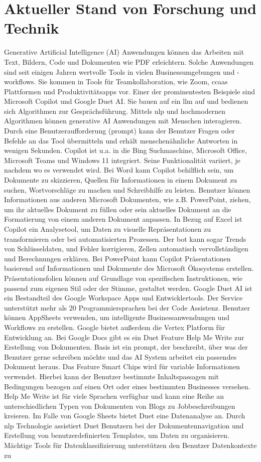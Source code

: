 \section{Aktueller Stand von Forschung und Technik}
Generative Artificial Intelligence (AI) Anwendungen können das Arbeiten mit Text, Bildern, Code und Dokumenten wie PDF erleichtern. Solche Anwendungen sind seit einigen Jahren wertvolle Tools in vielen Businessumgebungen und -workflows. Sie kommen in Tools für Teamkollaboration, wie Zoom, \gls{ccaas} Plattformen und Produktivitätsapps vor. Einer der prominentesten Beispiele sind Microsoft Copilot und Google Duet AI. Sie bauen auf ein \gls{llm} auf und bedienen sich Algorithmen zur Gesprächsführung. Mittels \gls{nlp} und hochmodernen Algorithmen können generative AI Anwendungen mit Menschen interagieren. Durch eine Benutzeraufforderung (prompt) kann der Benutzer Fragen oder Befehle an das Tool übermitteln und erhält menschenähnliche Antworten in wenigen Sekunden. Copilot ist u.a. in die Bing Suchmaschine, Microsoft Office, Microsoft Teams und Windows 11 integriert. Seine Funktionalität variiert, je nachdem wo es verwendet wird. Bei Word kann Copilot behilflich sein, um Dokumente zu skizzieren, Quellen für Informationen in einem Dokument zu suchen, Wortvorschläge zu machen und Schreibhilfe zu leisten. Benutzer können Informationen aus anderen Microsoft Dokumenten, wie z.B. PowerPoint, ziehen, um ihr aktuelles Dokument zu füllen oder sein aktuelles Dokument an die Formatierung von einem anderen Dokument anpassen. In Bezug auf Excel ist Copilot ein Analysetool, um Daten zu visuelle Repräsentationen zu transformieren oder bei automatisierten Prozessen. Der bot kann sogar Trends von Schlüsseldaten, und Fehler korrigieren, Zellen automatisch vervollständigen und Berechnungen erklären. Bei PowerPoint kann Copilot Präsentationen basierend auf Informationen und Dokumente des Microsoft Ökosystems erstellen. Präsentationsfolien können auf Grundlage von spezifischen Instruktionen, wie passend zum eigenen Stil oder der Stimme, gestaltet werden. Google Duet AI ist ein Bestandteil des Google Workspace Apps und Entwicklertools. Der Service unterstützt mehr als 20 Programmiersprachen bei der Code Assistenz. Benutzer können AppSheets verwenden, um intelligente Businessanwendungen und Workflows zu erstellen. Google bietet außerdem die Vertex Platform für Entwicklung an. Bei Google Docs gibt es ein Duet Feature Help Me Write zur Erstellung von Dokumenten. Basis ist ein prompt, der beschreibt, über was der Benutzer gerne schreiben möchte und das AI System arbeitet ein passendes Dokument heraus. Das Feature Smart Chips wird für variable Informationen verwendet. Hierbei kann der Benutzer bestimmte Inhaltspassagen mit Bedingungen bezogen auf einen Ort oder eines bestimmten Businesses versehen. Help Me Write ist für viele Sprachen verfügbar und kann eine Reihe an unterschiedlichen Typen von Dokumenten von Blogs zu Jobbeschreibungen kreieren. Im Falle von Google Sheets bietet Duet eine Datenanalyse an. Durch \gls{nlp} Technologie assistiert Duet Benutzern bei der Dokumentennavigation und Erstellung von benutzerdefinierten Templates, um Daten zu organisieren. Mächtige Tools für Datenklassifizierung unterstützen den Benutzer Datenkontexte zu 